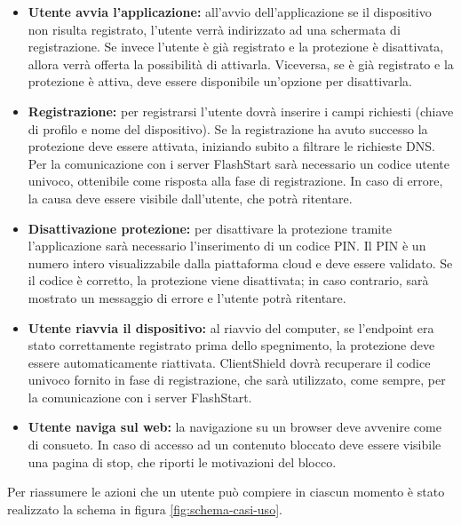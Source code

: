 \documentclass[12pt,a4paper,openright,twoside]{book}
\begin{document}
\begin{itemize}
	
	\item \textbf{Utente avvia l'applicazione:}
	all'avvio dell'applicazione se il dispositivo non risulta registrato, l'utente verrà indirizzato ad una schermata di registrazione.
	Se invece l'utente è già registrato e la protezione è disattivata, allora verrà offerta la possibilità di attivarla.
	Viceversa, se è già registrato e la protezione è attiva, deve essere disponibile un'opzione per disattivarla.
	
	\item \textbf{Registrazione:}
	per registrarsi l'utente dovrà inserire i campi richiesti (chiave di profilo e nome del dispositivo).
	Se la registrazione ha avuto successo la protezione deve essere attivata, iniziando subito a filtrare le richieste \gls{DNS}.
	Per la comunicazione con i server FlashStart sarà necessario un codice utente univoco, ottenibile come risposta alla fase di registrazione.
	In caso di errore, la causa deve essere visibile dall'utente, che potrà ritentare.
	
	\item \textbf{Disattivazione protezione:}
	per disattivare la protezione tramite l'applicazione sarà necessario l'inserimento di un codice PIN.
	Il PIN è un numero intero visualizzabile dalla piattaforma cloud e deve essere validato.
	Se il codice è corretto, la protezione viene disattivata; in caso contrario, sarà mostrato un messaggio di errore e l'utente potrà ritentare.
	
	\item \textbf{Utente riavvia il dispositivo:}
	al riavvio del computer, se l'endpoint era stato correttamente registrato prima dello spegnimento, la protezione deve essere automaticamente riattivata.
	ClientShield dovrà recuperare il codice univoco fornito in fase di registrazione, che sarà utilizzato, come sempre, per la comunicazione con i server FlashStart.
	
	\item \textbf{Utente naviga sul web:}
	la navigazione su un browser deve avvenire come di consueto.
	In caso di accesso ad un contenuto bloccato deve essere visibile una pagina di stop, che riporti le motivazioni del blocco.

\end{itemize}

Per riassumere le azioni che un utente può compiere in ciascun momento è stato realizzato la schema in figura \ref{fig:schema-casi-uso}.
\end{document}
